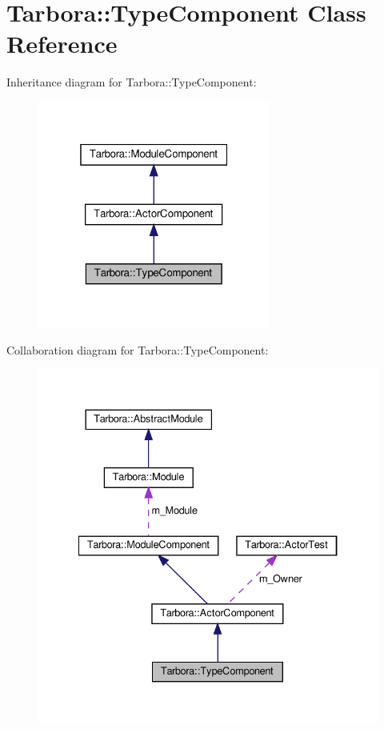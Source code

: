 \hypertarget{classTarbora_1_1TypeComponent}{}\section{Tarbora\+:\+:Type\+Component Class Reference}
\label{classTarbora_1_1TypeComponent}


Inheritance diagram for Tarbora\+:\+:Type\+Component\+:
\nopagebreak
\begin{figure}[H]
\begin{center}
\leavevmode
\includegraphics[width=217pt]{classTarbora_1_1TypeComponent__inherit__graph}
\end{center}
\end{figure}


Collaboration diagram for Tarbora\+:\+:Type\+Component\+:
\nopagebreak
\begin{figure}[H]
\begin{center}
\leavevmode
\includegraphics[width=334pt]{classTarbora_1_1TypeComponent__coll__graph}
\end{center}
\end{figure}
